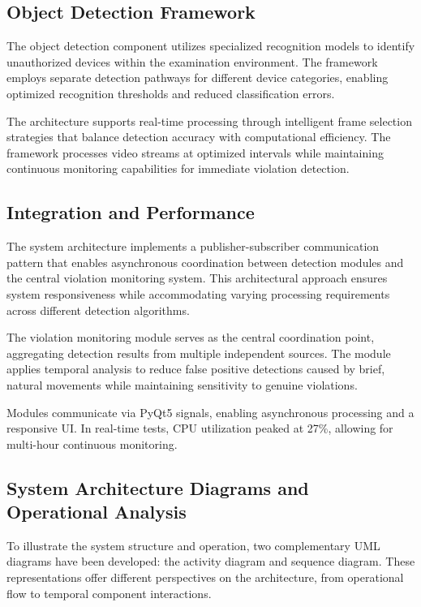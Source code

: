 \documentclass[conference]{IEEEtran}
\begin{document}
\subsection{Object Detection Framework}

The object detection component utilizes specialized recognition models to identify 
unauthorized devices within the examination environment. The framework employs separate 
detection pathways for different device categories, enabling optimized recognition 
thresholds and reduced classification errors.

The architecture supports real-time processing through intelligent frame selection 
strategies that balance detection accuracy with computational efficiency. The framework 
processes video streams at optimized intervals while maintaining continuous monitoring 
capabilities for immediate violation detection.

\subsection{Integration and Performance}

The system architecture implements a publisher-subscriber communication pattern that 
enables asynchronous coordination between detection modules and the central violation 
monitoring system. This architectural approach ensures system responsiveness while 
accommodating varying processing requirements across different detection algorithms.

The violation monitoring module serves as the central coordination point, aggregating 
detection results from multiple independent sources. The module applies temporal analysis 
to reduce false positive detections caused by brief, natural movements while maintaining 
sensitivity to genuine violations.

Modules communicate via PyQt5 signals, enabling asynchronous processing and a responsive UI. In real-time tests, CPU utilization peaked at 27\%, allowing for multi-hour continuous monitoring.

\subsection{System Architecture Diagrams and Operational Analysis}

To illustrate the system structure and operation, two complementary UML diagrams have 
been developed: the activity diagram and sequence diagram. These representations offer 
different perspectives on the architecture, from operational flow to temporal component 
interactions.
\end{document}
